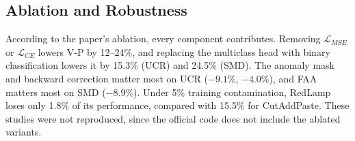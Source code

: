 \documentclass[sigconf,nonacm]{acmart}
\begin{document}
\par\vspace{5pt plus 6pt minus 3pt}\noindent
\begin{minipage}[b]{\columnwidth}
\setlength{\abovecaptionskip}{0pt}%
\setlength{\belowcaptionskip}{5pt}%
%
\label{tab:repro}%
\centering
\footnotesize
\setlength{\tabcolsep}{4.5pt}%
\end{minipage}\par\vspace{2pt plus 3pt minus 2pt}

\subsection{Ablation and Robustness}
According to the paper's ablation, every component contributes. Removing $\mathcal{L}_{MSE}$ or $\mathcal{L}_{CE}$ lowers V-P by 12--24\%, and replacing the multiclass head with binary classification lowers it by 15.3\% (UCR) and 24.5\% (SMD). The anomaly mask and backward correction matter most on UCR ($-9.1\%$, $-4.0\%$), and FAA matters most on SMD ($-8.9\%$). Under 5\% training contamination, RedLamp loses only 1.8\% of its performance, compared with 15.5\% for CutAddPaste. These studies were not reproduced, since the official code does not include the ablated variants.
\end{document}
